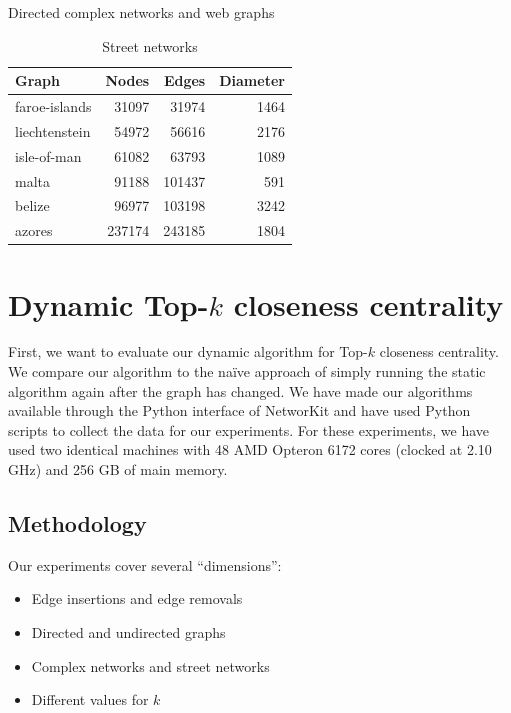 \begin{table}[h!]
{\caption{Directed complex networks and web graphs}
}
\end{table}

\begin{table}[h!]
\centering
\begin{tabular}{lrrr}
\hline
 Graph         &   Nodes &   Edges &   Diameter \\
\hline
 faroe-islands &   31097 &   31974 &       1464 \\
 liechtenstein &   54972 &   56616 &       2176 \\
 isle-of-man   &   61082 &   63793 &       1089 \\
 malta         &   91188 &  101437 &        591 \\
 belize        &   96977 &  103198 &       3242 \\
 azores        &  237174 &  243185 &       1804 \\
\hline
\end{tabular}
\caption{Street networks}
\label{tbl:streetNetworks}

\end{table}


\FloatBarrier

\section{Dynamic Top-$k$ closeness centrality}
First, we want to evaluate our dynamic algorithm for Top-$k$ closeness centrality. We compare our algorithm to the na\"ive approach of simply running the static algorithm again after the graph has changed. We have made our algorithms available through the Python interface of NetworKit and have used Python scripts to collect the data for our experiments. For these experiments, we have used two identical machines with 48 AMD Opteron 6172 cores (clocked at 2.10 GHz) and 256 GB of main memory.

\subsection{Methodology}
Our experiments cover several ``dimensions'':

\begin{itemize}
	\item Edge insertions and edge removals
	\item Directed and undirected graphs
	\item Complex networks and street networks
	\item Different values for $k$
\end{itemize}

